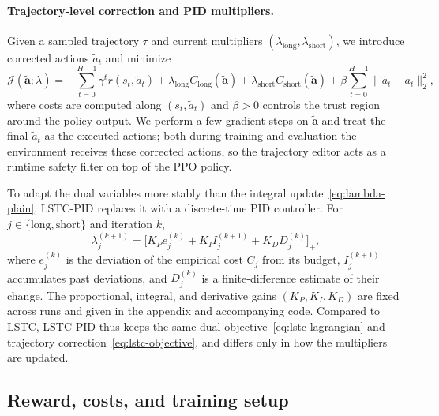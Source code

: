 \documentclass[11pt]{article}
\begin{document}
\paragraph{Trajectory-level correction and PID multipliers.}
Given a sampled trajectory $\tau$ and current multipliers $(\lambda_{\text{long}},\lambda_{\text{short}})$, we introduce corrected actions $\tilde{a}_t$ and minimize
\begin{equation}
  \mathcal{J}(\tilde{\mathbf{a}};\lambda)
  = - \sum_{t=0}^{H-1}\gamma^t r(s_t,\tilde{a}_t)
    + \lambda_{\text{long}} C_{\text{long}}(\tilde{\mathbf{a}})
    + \lambda_{\text{short}} C_{\text{short}}(\tilde{\mathbf{a}})
    + \beta \sum_{t=0}^{H-1}\|\tilde{a}_t - a_t\|_2^2,
  \label{eq:lstc-objective}
\end{equation}
where costs are computed along $(s_t,\tilde{a}_t)$ and $\beta>0$ controls the trust region around the policy output.
We perform a few gradient steps on $\tilde{\mathbf{a}}$ and treat the final $\tilde{a}_t$ as the executed actions; both during training and evaluation the environment receives these corrected actions, so the trajectory editor acts as a runtime safety filter on top of the PPO policy.

To adapt the dual variables more stably than the integral update~\eqref{eq:lambda-plain}, LSTC-PID replaces it with a discrete-time PID controller.
For $j\in\{\text{long},\text{short}\}$ and iteration $k$,
\begin{equation}
  \lambda_j^{(k+1)} =
  \Big[K_P e_j^{(k)} + K_I I_j^{(k+1)} + K_D D_j^{(k)}\Big]_+,
  \label{eq:pid-update}
\end{equation}
where $e_j^{(k)}$ is the deviation of the empirical cost $C_j$ from its budget, $I_j^{(k+1)}$ accumulates past deviations, and $D_j^{(k)}$ is a finite-difference estimate of their change.
The proportional, integral, and derivative gains $(K_P,K_I,K_D)$ are fixed across runs and given in the appendix and accompanying code.
Compared to LSTC, LSTC-PID thus keeps the same dual objective~\eqref{eq:lstc-lagrangian} and trajectory correction~\eqref{eq:lstc-objective}, and differs only in how the multipliers are updated.

\subsection*{Reward, costs, and training setup}
\end{document}
